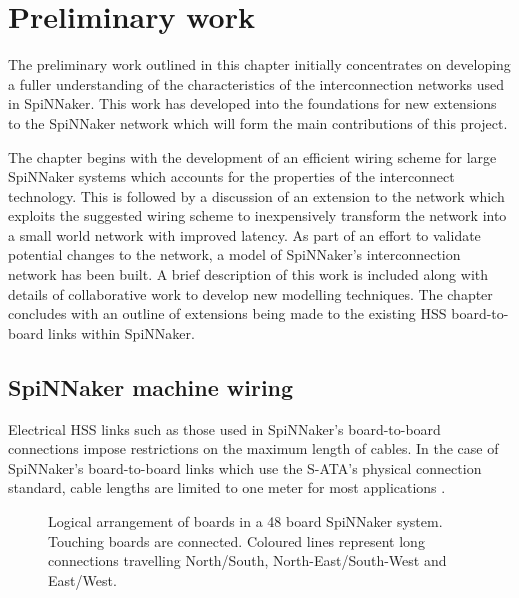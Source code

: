 \chapter{Preliminary work}
	\label{sec:preliminary-work}
	
	
	The preliminary work outlined in this chapter initially concentrates on
	developing a fuller understanding of the characteristics of the
	interconnection networks used in SpiNNaker. This work has developed into the
	foundations for new extensions to the SpiNNaker network which will form the
	main contributions of this project.
	
	The chapter begins with the development of an efficient wiring scheme for
	large SpiNNaker systems which accounts for the properties of the interconnect
	technology. This is followed by a discussion of an extension to the network
	which exploits the suggested wiring scheme to inexpensively transform the
	network into a small world network with improved latency.  As part of an
	effort to validate potential changes to the network, a model of SpiNNaker's
	interconnection network has been built. A brief description of this work is
	included along with details of collaborative work to develop new modelling
	techniques.  The chapter concludes with an outline of extensions being made to
	the existing HSS board-to-board links within SpiNNaker.
	
	\section{SpiNNaker machine wiring}
		
		
		Electrical HSS links such as those used in SpiNNaker's board-to-board
		connections impose restrictions on the maximum length of cables. In the case
		of SpiNNaker's board-to-board links which use the S-ATA's physical
		connection standard, cable lengths are limited to one meter for most
		applications \cite{sata3spec}.
		
		\begin{figure}
			\center
			
			\caption[Logical arrangement of boards in a 48 board SpiNNaker
			system.]{Logical arrangement of boards in a 48 board SpiNNaker system.
			Touching boards are connected. Coloured lines represent long connections
			travelling {\color{red}North/South},
			{\color{green}North-East/South-West} and {\color{blue}East/West}.}
			\label{fig:boardsLogical}
		\end{figure}
		

